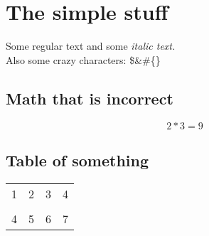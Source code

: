 \documentclass{article}
\begin{document}
\section{The simple stuff}
Some regular text and some
\textit{italic text. }
\\Also some crazy characters: \$\&\#\{\}
\subsection{Math that is incorrect}
$$
2*3 = 9
$$


\subsection{Table of something}
\begin{tabular}{rc|cl}
\hline
1&2&3&4\\
\cline{1-2}
&&&\\
4&5&6&7\\
\end{tabular}
\end{document}
